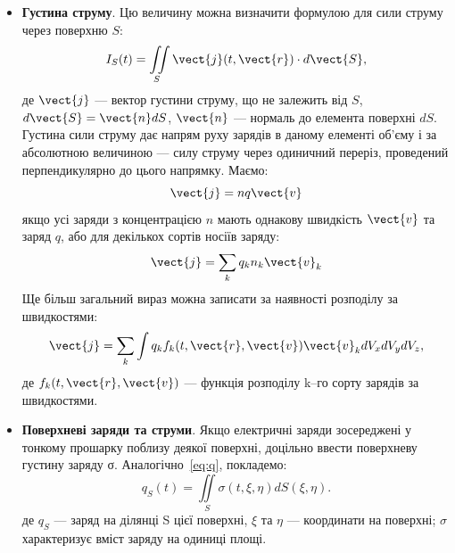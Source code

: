 \begin{itemize}
	      Функцію $\rho(t, \vect{r})$ називають густиною заряду. Для сталого розподілу це є
	      величина заряду в одиниці об’єму.

	      Якщо в середовищі присутні однакові носії з зарядом $q$ й об’ємною
	      густиною їх числа (концентрацією) $n$:
	      \begin{equation}
		      \rho = qn
	      \end{equation}
	      а в більш загальному випадку:
	      \begin{equation}
		      \rho(t, \vect{r}) = \sum\limits_k q_kn_k(t, \vect{r}),
	      \end{equation}
	      де індекс $k$ відповідає різним сортам носіїв заряду, кожен із своєю концентрацією.


	\item \textbf{Густина струму}. Цю величину можна визначити формулою для сили
	      струму через поверхню $S$:
	      \begin{equation}
		      I_S(t) = \iint\limits_S \vect{j}(t, \vect{r})\cdot d\vect{S},
	      \end{equation}
	      де $\vect{j}$ --- вектор густини струму, що не залежить від $S$, $d\vect{S} = \vect{n} dS$, $\vect{n}$ --- нормаль до
	      елемента поверхні $dS$. Густина сили струму дає напрям руху зарядів в даному
	      елементі об’єму і за абсолютною величиною --- силу струму через одиничний
	      переріз, проведений перпендикулярно до цього напрямку. Маємо:
	      \begin{equation}
		      \vect{j} = nq\vect{v}
	      \end{equation}
	      якщо усі заряди з концентрацією $n$ мають однакову швидкість $\vect{v}$ та заряд $q$,
	      або для декількох сортів носіїв заряду:
	      \begin{equation}
		      \vect{j} = \sum\limits_k q_k n_k\vect{v}_k
	      \end{equation}
	      Ще більш загальний вираз можна записати за наявності розподілу за
	      швидкостями:
	      \begin{equation}
		      \vect{j} = \sum\limits_k \int  q_k f_k(t, \vect{r}, \vect{v}) \vect{v}_k dV_xdV_ydV_z,
	      \end{equation}
	      де $f_k(t, \vect{r}, \vect{v})$ --- функція розподілу k–го сорту зарядів за швидкостями.


	\item \textbf{Поверхневі заряди та струми}.  Якщо електричні заряди зосереджені у
	      тонкому прошарку поблизу деякої поверхні, доцільно ввести поверхневу
	      густину заряду σ. Аналогічно~\eqref{eq:q}, покладемо:
	      \begin{equation}
		      q_S(t) = \iint\limits_S \sigma(t, \xi, \eta) dS(\xi, \eta).
	      \end{equation}
	      де $q_S$ --- заряд на ділянці S цієї поверхні, $\xi$ та $\eta$ --- координати на поверхні; $\sigma$
	      характеризує вміст заряду на одиниці площі.



\end{itemize}
